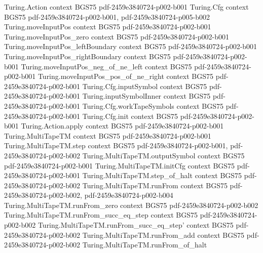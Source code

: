 \begin{theorem}
\label{Complexity.P_eq_NP_of_NPHard_mem_P}
\leanok
\proofstep
  {Turing.Action}
  {context}
  {BGS75}
  {pdf-2459e3840724-p002-b001}
\proofstep
  {Turing.Cfg}
  {context}
  {BGS75}
  {pdf-2459e3840724-p002-b001,
    pdf-2459e3840724-p005-b002}
\proofstep
  {Turing.moveInputPos}
  {context}
  {BGS75}
  {pdf-2459e3840724-p002-b001}
\proofstep
  {Turing.moveInputPos_zero}
  {context}
  {BGS75}
  {pdf-2459e3840724-p002-b001}
\proofstep
  {Turing.moveInputPos_leftBoundary}
  {context}
  {BGS75}
  {pdf-2459e3840724-p002-b001}
\proofstep
  {Turing.moveInputPos_rightBoundary}
  {context}
  {BGS75}
  {pdf-2459e3840724-p002-b001}
\proofstep
  {Turing.moveInputPos_neg_of_ne_left}
  {context}
  {BGS75}
  {pdf-2459e3840724-p002-b001}
\proofstep
  {Turing.moveInputPos_pos_of_ne_right}
  {context}
  {BGS75}
  {pdf-2459e3840724-p002-b001}
\proofstep
  {Turing.Cfg.inputSymbol}
  {context}
  {BGS75}
  {pdf-2459e3840724-p002-b001}
\proofstep
  {Turing.inputSymbolInner}
  {context}
  {BGS75}
  {pdf-2459e3840724-p002-b001}
\proofstep
  {Turing.Cfg.workTapeSymbols}
  {context}
  {BGS75}
  {pdf-2459e3840724-p002-b001}
\proofstep
  {Turing.Cfg.init}
  {context}
  {BGS75}
  {pdf-2459e3840724-p002-b001}
\proofstep
  {Turing.Action.apply}
  {context}
  {BGS75}
  {pdf-2459e3840724-p002-b001}
\proofstep
  {Turing.MultiTapeTM}
  {context}
  {BGS75}
  {pdf-2459e3840724-p002-b001}
\proofstep
  {Turing.MultiTapeTM.step}
  {context}
  {BGS75}
  {pdf-2459e3840724-p002-b001,
    pdf-2459e3840724-p002-b002}
\proofstep
  {Turing.MultiTapeTM.outputSymbol}
  {context}
  {BGS75}
  {pdf-2459e3840724-p002-b001}
\proofstep
  {Turing.MultiTapeTM.initCfg}
  {context}
  {BGS75}
  {pdf-2459e3840724-p002-b001}
\proofstep
  {Turing.MultiTapeTM.step_of_halt}
  {context}
  {BGS75}
  {pdf-2459e3840724-p002-b002}
\proofstep
  {Turing.MultiTapeTM.runFrom}
  {context}
  {BGS75}
  {pdf-2459e3840724-p002-b002,
    pdf-2459e3840724-p002-b004}
\proofstep
  {Turing.MultiTapeTM.runFrom_zero}
  {context}
  {BGS75}
  {pdf-2459e3840724-p002-b002}
\proofstep
  {Turing.MultiTapeTM.runFrom_succ_eq_step}
  {context}
  {BGS75}
  {pdf-2459e3840724-p002-b002}
\proofstep
  {Turing.MultiTapeTM.runFrom_succ_eq_step'}
  {context}
  {BGS75}
  {pdf-2459e3840724-p002-b002}
\proofstep
  {Turing.MultiTapeTM.runFrom_add}
  {context}
  {BGS75}
  {pdf-2459e3840724-p002-b002}
\proofstep
  {Turing.MultiTapeTM.runFrom_of_halt}

\end{theorem}
